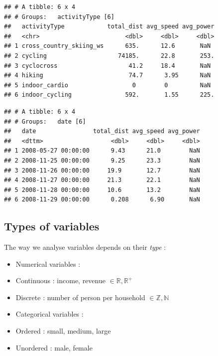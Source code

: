 \documentclass[
]{book}
\newenvironment{Shaded}{\begin{snugshade}}{\end{snugshade}}
\newcommand{\DataTypeTok}[1]{\textcolor[rgb]{0.13,0.29,0.53}{#1}}
\newcommand{\KeywordTok}[1]{\textcolor[rgb]{0.13,0.29,0.53}{\textbf{#1}}}
\newcommand{\NormalTok}[1]{#1}
\newcommand{\OperatorTok}[1]{\textcolor[rgb]{0.81,0.36,0.00}{\textbf{#1}}}
\newcommand{\StringTok}[1]{\textcolor[rgb]{0.31,0.60,0.02}{#1}}
\providecommand{\tightlist}{%
  \setlength{\itemsep}{0pt}\setlength{\parskip}{0pt}}
\begin{document}
\begin{verbatim}
## # A tibble: 6 x 4
## # Groups:   activityType [6]
##   activityType            total_dist avg_speed avg_power
##   <chr>                        <dbl>     <dbl>     <dbl>
## 1 cross_country_skiing_ws      635.      12.6       NaN 
## 2 cycling                    74185.      22.8       253.
## 3 cyclocross                    41.2     18.4       NaN 
## 4 hiking                        74.7      3.95      NaN 
## 5 indoor_cardio                  0        0         NaN 
## 6 indoor_cycling               592.       1.55      225.
\end{verbatim}

\begin{Shaded}
\end{Shaded}

\begin{verbatim}
## # A tibble: 6 x 4
## # Groups:   date [6]
##   date                total_dist avg_speed avg_power
##   <dttm>                   <dbl>     <dbl>     <dbl>
## 1 2008-05-27 00:00:00      9.43      21.0        NaN
## 2 2008-11-25 00:00:00      9.25      23.3        NaN
## 3 2008-11-26 00:00:00     19.9       12.7        NaN
## 4 2008-11-27 00:00:00     21.3       22.1        NaN
## 5 2008-11-28 00:00:00     10.6       13.2        NaN
## 6 2008-11-29 00:00:00      0.208      6.90       NaN
\end{verbatim}

\hypertarget{types-of-variables}{%
\subsection{Types of variables}\label{types-of-variables}}

The way we analyse variables depends on their \emph{type} :

\begin{itemize}
\tightlist
\item
  Numerical variables :
\item
  Continuous : income, revenue \(\in \mathbb{R} , \mathbb{R}^+\)
\item
  Discrete : number of person per household \(\in \mathbb{Z} , \mathbb{N}\)
\item
  Categorical variables :
\item
  Ordered : small, medium, large
\item
  Unordered : male, female
\end{itemize}
\end{document}
